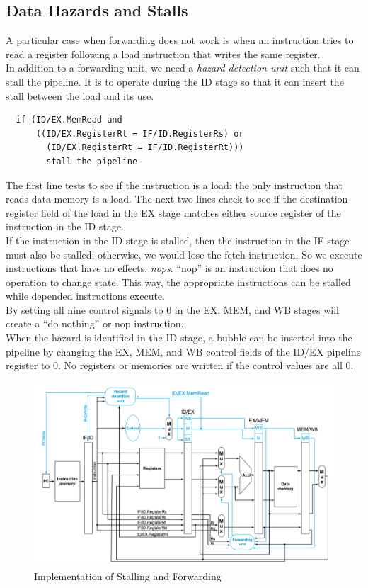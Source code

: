 \documentclass[12pt]{article}
\theoremstyle{definition}
\begin{document}
  \subsection{Data Hazards and Stalls}
  A particular case when forwarding does not work is when an instruction tries to read a register following a load instruction that writes the same register. \\
  In addition to a forwarding unit, we need a \emph{hazard detection unit} such that it can stall the pipeline.
  It is to operate during the ID stage so that it can insert the stall between the load and its use.
  \begin{verbatim}
  if (ID/EX.MemRead and
      ((ID/EX.RegisterRt = IF/ID.RegisterRs) or
        (ID/EX.RegisterRt = IF/ID.RegisterRt)))
        stall the pipeline
  \end{verbatim}
  The first line tests to see if the instruction is a load: the only instruction that reads data memory is a load.
  The next two lines check to see if the destination register field of the load in the EX stage matches either source register of the instruction in the ID stage. \\

  If the instruction in the ID stage is stalled, then the instruction in the IF stage must also be stalled;
  otherwise, we would lose the fetch instruction.
  So we execute instructions that have no effects: \emph{nops}.
  ``nop'' is an instruction that does no operation to change state.
  This way, the appropriate instructions can be stalled while depended instructions execute. \\

  By setting all nine control signals to 0 in the EX, MEM, and WB stages will create a ``do nothing'' or nop instruction. \\
  When the hazard is identified in the ID stage, a bubble can be inserted into the pipeline by changing the EX, MEM, and WB control fields of the ID/EX pipeline register to 0.
  No registers or memories are written if the control values are all 0. \\

  \begin{figure}[!ht]
  \includegraphics[width=1.0\textwidth]{pictures/hazardAndForwardingUnits.png}
  \caption{Implementation of Stalling and Forwarding}
  \end{figure}
\end{document}
